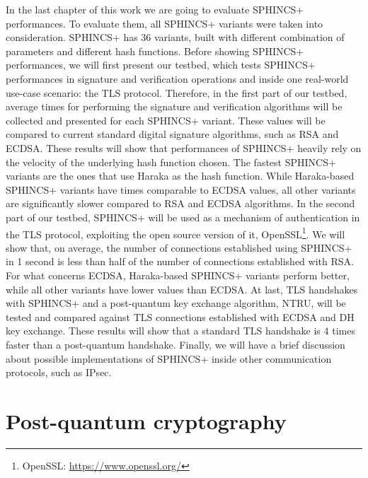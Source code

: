 \documentclass[a4paper,12pt]{article}
\begin{document}
In the last chapter of this work we are going to evaluate SPHINCS+ performances. To evaluate them, all SPHINCS+ variants were taken into consideration. SPHINCS+ has 36 variants, built with different combination of parameters and different hash functions.
Before showing SPHINCS+ performances, we will first present our testbed, which tests SPHINCS+ performances in signature and verification operations and inside one real-world use-case scenario: the TLS protocol. 
Therefore, in the first part of our testbed, average times for performing the signature and verification algorithms will be collected and presented for each SPHINCS+ variant. These values will be compared to current standard digital signature algorithms, such as RSA and ECDSA. These results will show that performances of SPHINCS+ heavily rely on the velocity of the underlying hash function chosen. The fastest SPHINCS+ variants are the ones that use Haraka as the hash function. While Haraka-based SPHINCS+ variants have times comparable to ECDSA values, all other variants are significantly slower compared to RSA and ECDSA algorithms.
In the second part of our testbed, SPHINCS+ will be used as a mechanism of authentication in the TLS protocol, exploiting the open source version of it, OpenSSL\footnote{OpenSSL: \url{https://www.openssl.org/}}. We will show that, on average, the number of connections established using SPHINCS+ in 1 second is less than half of the number of connections established with RSA. For what concerns ECDSA, Haraka-based SPHINCS+ variants perform better, while all other variants have lower values than ECDSA.
At last, TLS handshakes with SPHINCS+ and a post-quantum key exchange algorithm, NTRU, will be tested and compared against TLS connections established with ECDSA and DH key exchange. These results will show that a standard TLS handshake is 4 times faster than a post-quantum handshake. 
Finally, we will have a brief discussion about possible implementations of SPHINCS+ inside other communication protocols, such as IPsec.

\section{Post-quantum cryptography}

\end{document}
